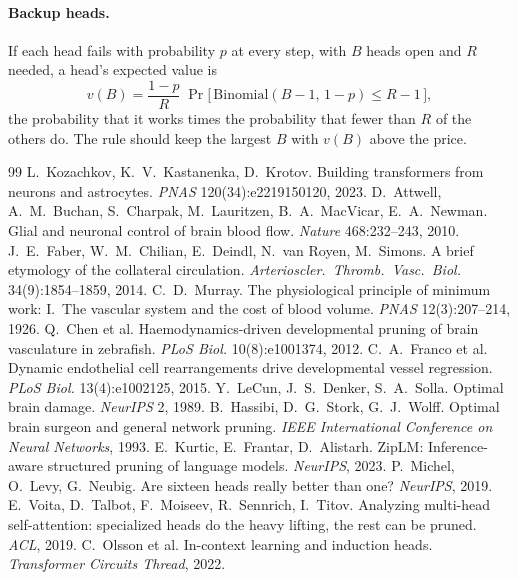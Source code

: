 \documentclass[11pt]{report}
\begin{document}
\paragraph{Backup heads.} If each head fails with probability $p$ at every step, with $B$ heads
open and $R$ needed, a head's expected value is
\begin{equation}
v(B) = \frac{1-p}{R}\; \Pr\big[\,\text{Binomial}(B-1,\,1-p) \le R-1\,\big],
\end{equation}
the probability that it works times the probability that fewer than $R$ of the others do. The
rule should keep the largest $B$ with $v(B)$ above the price.

\begin{thebibliography}{99}
 L.~Kozachkov, K.~V.~Kastanenka, D.~Krotov. Building transformers from
  neurons and astrocytes. \emph{PNAS} 120(34):e2219150120, 2023.
 D.~Attwell, A.~M.~Buchan, S.~Charpak, M.~Lauritzen, B.~A.~MacVicar,
  E.~A.~Newman. Glial and neuronal control of brain blood flow. \emph{Nature} 468:232--243, 2010.
 J.~E.~Faber, W.~M.~Chilian, E.~Deindl, N.~van Royen, M.~Simons. A brief
  etymology of the collateral circulation. \emph{Arterioscler.\ Thromb.\ Vasc.\ Biol.}
  34(9):1854--1859, 2014.
 C.~D.~Murray. The physiological principle of minimum work: I.\ The vascular
  system and the cost of blood volume. \emph{PNAS} 12(3):207--214, 1926.
 Q.~Chen et al. Haemodynamics-driven developmental pruning of brain
  vasculature in zebrafish. \emph{PLoS Biol.} 10(8):e1001374, 2012.
 C.~A.~Franco et al. Dynamic endothelial cell rearrangements drive
  developmental vessel regression. \emph{PLoS Biol.} 13(4):e1002125, 2015.
 Y.~LeCun, J.~S.~Denker, S.~A.~Solla. Optimal brain damage. \emph{NeurIPS} 2, 1989.
 B.~Hassibi, D.~G.~Stork, G.~J.~Wolff. Optimal brain surgeon and general network
  pruning. \emph{IEEE International Conference on Neural Networks}, 1993.
 E.~Kurtic, E.~Frantar, D.~Alistarh. ZipLM: Inference-aware structured pruning
  of language models. \emph{NeurIPS}, 2023.
 P.~Michel, O.~Levy, G.~Neubig. Are sixteen heads really better than
  one? \emph{NeurIPS}, 2019.
 E.~Voita, D.~Talbot, F.~Moiseev, R.~Sennrich, I.~Titov. Analyzing
  multi-head self-attention: specialized heads do the heavy lifting, the rest can be pruned.
  \emph{ACL}, 2019.
 C.~Olsson et al. In-context learning and induction heads.
  \emph{Transformer Circuits Thread}, 2022.
\end{thebibliography}
\end{document}

